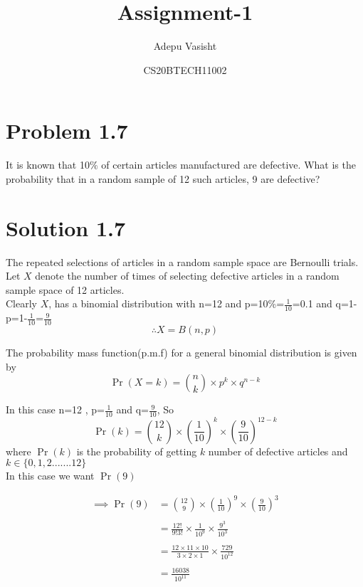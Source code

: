 \documentclass[journal,12pt,twocolumn]{IEEEtran}
\title{Assignment-1}
\author{Adepu Vasisht}
\date{CS20BTECH11002}
\begin{document}
\maketitle

\section*{Problem 1.7}
It is known that 10$\%$ of certain articles manufactured are defective. What is the probability that in a random sample of 12 such articles, 9 are defective?
\section*{Solution 1.7}
The repeated selections of articles in a random sample space are Bernoulli trials. Let $X$ denote the number of times of selecting defective articles in a random sample space of 12 articles.\\

Clearly $X$, has a binomial distribution with n=12 and p=10\%=$\frac{1}{10}$=0.1
and q=1-p=1-$\frac{1}{10}$=$\frac{9}{10}$\\

$$\therefore X = B (n,p)$$

The probability mass function(p.m.f) for a general binomial distribution is given by $$\Pr(X=k)= {n \choose k} \times p^k\times q^{n-k}$$

In this case n=12 , p=$\frac{1}{10}$ and q=$\frac{9}{10}$, So 
$$\Pr(k)={12 \choose k}\times(\frac{1}{10})^k\times(\frac{9}{10})^{12-k}$$
where $\Pr(k)$ is the probability of getting $k$ number of defective articles and $k\in \{0,1,2.......12\}$\\

In this case we want $\Pr(9)$ 
    
\begin{align*}
  \implies\Pr(9) &={12 \choose 9}\times(\frac{1}{10})^9\times(\frac{9}{10})^{3} \\\\   &=\frac{12!}{9!3!}\times\frac{1}{10^9}\times\frac{9^3}{10^3}\\\\
  &=\frac{12\times11\times10}{3\times2\times1}\times\frac{729}{10^{12}}\\\\
  &=\frac{16038}{10^{11}}\\\\
\end{align*}
 
\end{document}
